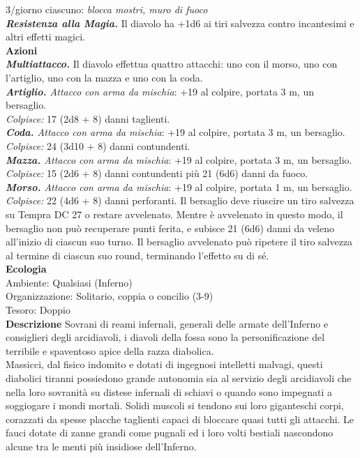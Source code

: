 \begin{multicols}{2}
3/giorno ciascuno: \emph{blocca mostri, muro di fuoco}\\
\emph{\textbf{Resistenza alla Magia.}} Il diavolo ha +1d6 ai tiri salvezza contro incantesimi e altri effetti magici.\\
\smallskip\textbf{Azioni}\\
\emph{\textbf{Multiattacco.}} Il diavolo effettua quattro attacchi: uno con il morso, uno con l'artiglio, uno con la mazza e uno con la coda.\\
\emph{\textbf{Artiglio.} Attacco con arma da mischia}: +19 al colpire, portata 3 m, un bersaglio.\\
\emph{Colpisce:} 17 (2d8 + 8) danni taglienti.\\
\emph{\textbf{Coda.} Attacco con arma da mischia}: +19 al colpire, portata 3 m, un bersaglio.\\
\emph{Colpisce:} 24 (3d10 + 8) danni contundenti.\\
\emph{\textbf{Mazza.} Attacco con arma da mischia}: +19 al colpire, portata 3 m, un bersaglio.\\
\emph{Colpisce:} 15 (2d6 + 8) danni contundenti più 21 (6d6) danni da fuoco.\\
\emph{\textbf{Morso.} Attacco con arma da mischia}: +19 al colpire, portata 1 m, un bersaglio.\\
\emph{Colpisce:} 22 (4d6 + 8) danni perforanti. Il bersaglio deve riuscire un tiro salvezza su Tempra DC  27 o restare avvelenato. Mentre è avvelenato in questo modo, il bersaglio non può recuperare punti ferita, e subisce 21 (6d6) danni da veleno all'inizio di ciascun suo turno. Il bersaglio avvelenato può ripetere il tiro salvezza al termine di ciascun suo round, terminando l'effetto su di sé. \\
\textbf{Ecologia}\\
Ambiente: Qualsiasi (Inferno)\\
Organizzazione: Solitario, coppia o concilio (3-9)\\
Tesoro: Doppio\\
\textbf{Descrizione}
Sovrani di reami infernali, generali delle armate dell’Inferno e consiglieri degli arcidiavoli, i diavoli della fossa sono la personificazione del terribile e spaventoso apice della razza diabolica.\\
Massicci, dal fisico indomito e dotati di ingegnosi intelletti malvagi, questi diabolici tiranni possiedono grande autonomia sia al servizio degli arcidiavoli che nella loro sovranità su distese infernali di schiavi o quando sono impegnati a soggiogare i mondi mortali. Solidi muscoli si tendono sui loro giganteschi corpi, corazzati da spesse placche taglienti capaci di bloccare quasi tutti gli attacchi. Le fauci dotate di zanne grandi come pugnali ed i loro volti bestiali nascondono alcune tra le menti più insidiose dell’Inferno.\\

\end{multicols}

